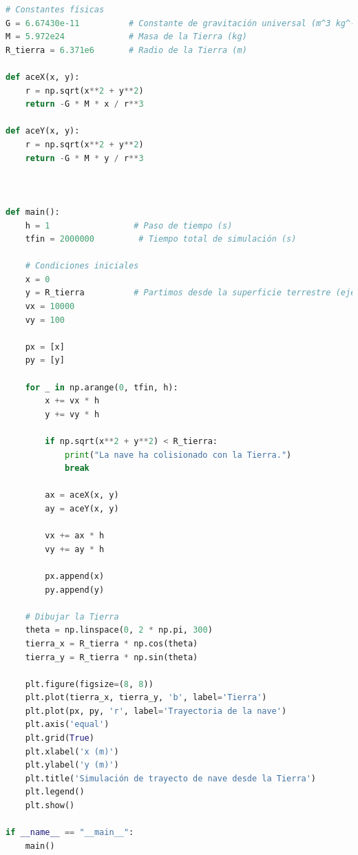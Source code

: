\documentclass{article}
\begin{document}
\begin{center}
\begin{lstlisting}[language=Python, caption={Análisis completo del sistema Tierra-nave}]
# Constantes físicas
G = 6.67430e-11          # Constante de gravitación universal (m^3 kg^-1 s^-2)
M = 5.972e24             # Masa de la Tierra (kg)
R_tierra = 6.371e6       # Radio de la Tierra (m)

def aceX(x, y):
    r = np.sqrt(x**2 + y**2)
    return -G * M * x / r**3

def aceY(x, y):
    r = np.sqrt(x**2 + y**2)
    return -G * M * y / r**3



def main():
    h = 1                 # Paso de tiempo (s)
    tfin = 2000000         # Tiempo total de simulación (s)

    # Condiciones iniciales
    x = 0
    y = R_tierra          # Partimos desde la superficie terrestre (eje Y)
    vx = 10000
    vy = 100

    px = [x]
    py = [y]

    for _ in np.arange(0, tfin, h):
        x += vx * h
        y += vy * h

        if np.sqrt(x**2 + y**2) < R_tierra:
            print("La nave ha colisionado con la Tierra.")
            break

        ax = aceX(x, y)
        ay = aceY(x, y)

        vx += ax * h
        vy += ay * h

        px.append(x)
        py.append(y)

    # Dibujar la Tierra
    theta = np.linspace(0, 2 * np.pi, 300)
    tierra_x = R_tierra * np.cos(theta)
    tierra_y = R_tierra * np.sin(theta)

    plt.figure(figsize=(8, 8))
    plt.plot(tierra_x, tierra_y, 'b', label='Tierra')
    plt.plot(px, py, 'r', label='Trayectoria de la nave')
    plt.axis('equal')
    plt.grid(True)
    plt.xlabel('x (m)')
    plt.ylabel('y (m)')
    plt.title('Simulación de trayecto de nave desde la Tierra')
    plt.legend()
    plt.show()

if __name__ == "__main__":
    main()
	\end{lstlisting}


\end{center}
\end{document}
